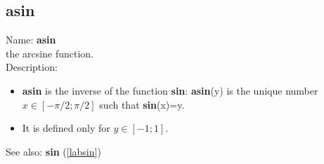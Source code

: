 \subsection{asin}
\label{labasin}
\noindent Name: \textbf{asin}\\
the arcsine function.\\
\noindent Description: \begin{itemize}

\item \textbf{asin} is the inverse of the function \textbf{sin}: \textbf{asin}(y) is the unique number 
   $x \in [-\pi/2; \pi/2]$ such that \textbf{sin}(x)=y.

\item It is defined only for $y \in [-1;1]$.
\end{itemize}
See also: \textbf{sin} (\ref{labsin})
